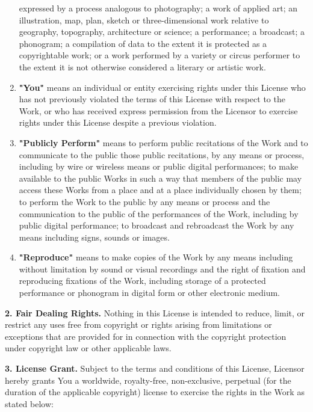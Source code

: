 \begin{enumerate}
  expressed by a process analogous to photography; a work of applied
  art; an illustration, map, plan, sketch or three-dimensional work
  relative to geography, topography, architecture or science; a
  performance; a broadcast; a phonogram; a compilation of data to the
  extent it is protected as a copyrightable work; or a work performed
  by a variety or circus performer to the extent it is not otherwise
  considered a literary or artistic work.
\item
  \textbf{"You"} means an individual or entity exercising rights
  under this License who has not previously violated the terms of
  this License with respect to the Work, or who has received express
  permission from the Licensor to exercise rights under this License
  despite a previous violation.
\item
  \textbf{"Publicly Perform"} means to perform public recitations of
  the Work and to communicate to the public those public recitations,
  by any means or process, including by wire or wireless means or
  public digital performances; to make available to the public Works
  in such a way that members of the public may access these Works
  from a place and at a place individually chosen by them; to perform
  the Work to the public by any means or process and the
  communication to the public of the performances of the Work,
  including by public digital performance; to broadcast and
  rebroadcast the Work by any means including signs, sounds or
  images.
\item
  \textbf{"Reproduce"} means to make copies of the Work by any means
  including without limitation by sound or visual recordings and the
  right of fixation and reproducing fixations of the Work, including
  storage of a protected performance or phonogram in digital form or
  other electronic medium.
\end{enumerate}

\noindent \textbf{2. Fair Dealing Rights.} Nothing in this License is
intended to reduce, limit, or restrict any uses free from copyright
or rights arising from limitations or exceptions that are provided
for in connection with the copyright protection under copyright law
or other applicable laws.

\noindent \textbf{3. License Grant.} Subject to the terms and conditions of
this License, Licensor hereby grants You a worldwide, royalty-free,
non-exclusive, perpetual (for the duration of the applicable
copyright) license to exercise the rights in the Work as stated
below:

